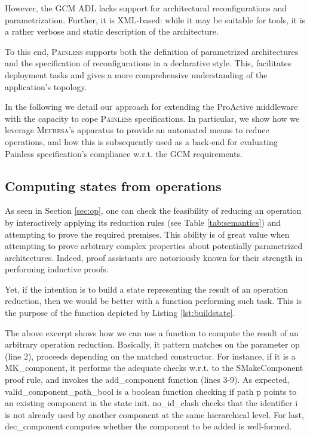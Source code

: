 	 However, the \ac{GCM} \ac{ADL} lacks support for architectural
	reconfigurations and parametrization. Further, it is XML-based: while it may be suitable
	for tools, it is a rather verbose and static description of the architecture.
		
	To this end, \textsc{Painless} supports both the definition
	of parametrized architectures and the specification of reconfigurations in a declarative style. This,
	facilitates deployment tasks and gives a more comprehensive understanding
	of the application's topology.  

	In the following we detail our approach for extending the ProActive middleware
	with the capacity to cope \textsc{Painless} specifications. In particular, we show how 
	we leverage \textsc{Mefresa}'s apparatus to provide an automated means to reduce
	\textsf{operations}, and how this is subsequently used as a back-end for evaluating \textsf{Painless}
	specification's compliance w.r.t. the \ac{GCM} requirements.
	

\subsection{Computing \textsf{states} from \textsf{operations}}
\label{sub:buildstate}


	As seen in Section \ref{sec:op}, one can check the feasibility
	of reducing an \textsf{operation} by interactively applying	
	its reduction rules (see Table \ref{tab:semantics}) and attempting to prove the required premises.
	This ability is of great value when attempting to prove arbitrary complex
	properties about potentially parametrized architectures. Indeed, proof
	assistants are notoriously known for their strength in performing 
	inductive proofs.

	Yet, if the intention is to build a \textsf{state} representing
	the result of an \textsf{operation} reduction, then we would be better
	with a function performing such task. This is the purpose of the
	function depicted by Listing \ref{lst:buildstate}.
	
	
							
	
	
	\noindent The above excerpt shows how we can use a function to compute the result
	of an arbitrary \textsf{operation} reduction. Basically, it pattern matches on the parameter \textsf{op} (line 2),
	proceeds depending on the matched constructor. For instance, if it is a \textsf{MK\_component},
	it performs the adequate checks w.r.t. to the \textsf{SMakeComponent} proof rule, 
	and invokes the \textsf{add\_component} function (lines 3-9). As expected,
	\textsf{valid\_component\_path\_bool} is a boolean function checking
	if path \textsf{p} points to an existing \textsf{component} in the \textsf{state} \textsf{init}.
	\textsf{no\_id\_clash} checks that the identifier \textsf{i} is not already
	used by another \textsf{component} at the same hierarchical level. For last,
	\textsf{dec\_component} computes whether the \textsf{component} to be
	added is well-formed.	
	
